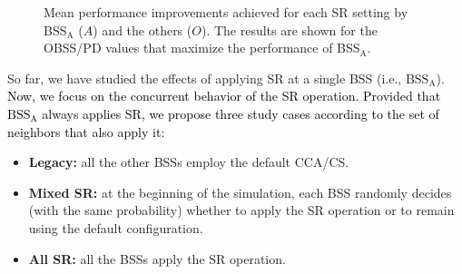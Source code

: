 \documentclass{ieeeaccess}
\begin{document}
\begin{figure}[ht!]
	\centering		
	\caption{Mean performance improvements achieved for each SR setting by BSS$_\text{A}$ ($A$) and the others ($O$). The results are shown for the OBSS/PD values that maximize the performance of BSS$_\text{A}$.}\label{fig:SIM_2_3}
\end{figure}

So far, we have studied the effects of applying SR at a single BSS (i.e., $\text{BSS}_\text{A}$). \textcolor{black}{Now, we focus on the concurrent behavior of the SR operation. Provided that $\text{BSS}_\text{A}$ always applies SR, we propose three study cases according to the set of neighbors that also apply it: }
\begin{itemize}
	\item \textbf{Legacy:} all the other BSSs employ the default CCA/CS.
	\item \textbf{Mixed SR:} at the beginning of the simulation, each BSS randomly decides (with the same probability) whether to apply the SR operation or to remain using the default configuration.
	\item \textbf{All SR:} all the BSSs apply the SR operation. 
\end{itemize}
\end{document}

